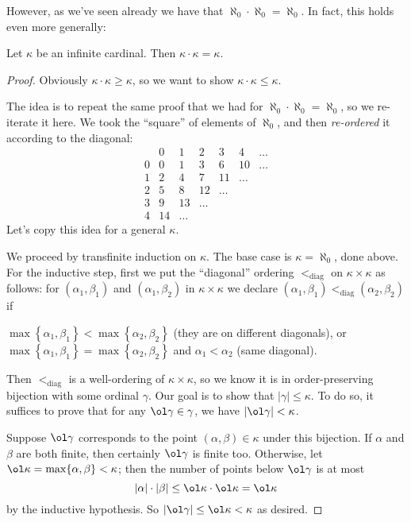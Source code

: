 However, as we've seen already we have that $\aleph_0 \cdot \aleph_0 = \aleph_0$.
In fact, this holds even more generally:

\begin{theorem}
	Let $\kappa$ be an infinite cardinal.
	Then $\kappa \cdot \kappa = \kappa$.
\end{theorem}
\begin{proof}
	Obviously $\kappa \cdot \kappa \ge \kappa$,
	so we want to show $\kappa \cdot \kappa \le \kappa$.

	The idea is to repeat the same proof that we had for $\aleph_0 \cdot \aleph_0 = \aleph_0$,
	so we re-iterate it here. We took the ``square'' of elements of $\aleph_0$, and then
	\emph{re-ordered} it according to the diagonal:
	\[
	\begin{array}{l|cccccc}
		  & 0 & 1 & 2 & 3 & 4 & \dots \\ \hline
		0 & 0 & 1 & 3 & 6 & 10 & \dots \\
		1 & 2 & 4 & 7 & 11 & \dots & \\
		2 & 5 & 8 & 12 & \dots & & \\
		3 & 9 & 13 & \dots & & & \\
		4 & 14 & \dots & & & &
	\end{array}
	\]
	Let's copy this idea for a general $\kappa$.

	We proceed by transfinite induction on $\kappa$.
	The base case is $\kappa = \aleph_0$, done above.
	For the inductive step, first we put the ``diagonal'' ordering $<_{\text{diag}}$
	on $\kappa \times \kappa$ as follows:
	for $(\alpha_1, \beta_1)$ and $(\alpha_1, \beta_2)$ in $\kappa \times \kappa$
	we declare $(\alpha_1, \beta_1) <_{\text{diag}} (\alpha_2, \beta_2)$ if
	\begin{itemize}
		\ii $\max \left\{ \alpha_1, \beta_1 \right\} < \max \left\{ \alpha_2, \beta_2 \right\}$
		(they are on different diagonals), or
		\ii $\max \left\{ \alpha_1, \beta_1 \right\} = \max \left\{ \alpha_2, \beta_2 \right\}$
		and $\alpha_1 < \alpha_2$ (same diagonal).
	\end{itemize}
	
	Then $<_{\text{diag}}$ is a well-ordering of $\kappa \times \kappa$,
	so we know it is in order-preserving bijection with some ordinal $\gamma$.
	Our goal is to show that $\left\lvert \gamma \right\rvert \le \kappa$.
	To do so, it suffices to prove that for any $\ol\gamma \in \gamma$,
	we have $\left\lvert \ol\gamma \right\rvert < \kappa$.

	Suppose $\ol\gamma$ corresponds to the point $(\alpha, \beta) \in \kappa$
	under this bijection.
	If $\alpha$ and $\beta$ are both finite, then certainly $\ol\gamma$ is finite too.
	Otherwise, let $\ol\kappa = \max \{\alpha, \beta\} < \kappa$;
	then the number of points below $\ol\gamma$ is at most
	\[ 
		\left\lvert \alpha \right\rvert \cdot \left\lvert \beta \right\rvert
		\le \ol\kappa \cdot \ol\kappa
		= \ol\kappa
	\]
	by the inductive hypothesis.
	So $\left\lvert \ol\gamma \right\rvert \le \ol\kappa < \kappa$ as desired.
\end{proof}

